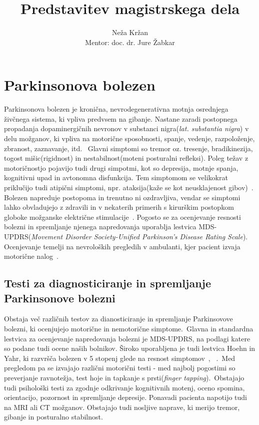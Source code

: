 \documentclass[a4paper,12pt]{article}
\title{Predstavitev magistrskega dela}
\author{Neža Kržan \\
Mentor: doc. dr. Jure Žabkar}
\begin{document}
\maketitle

\section{Parkinsonova bolezen}

Parkinsonova bolezen je kronična, nevrodegenerativna motnja osrednjega živčnega sistema, ki vpliva 
predvsem na gibanje. Nastane zaradi postopnega propadanja dopaminergičnih nevronov v substanci 
nigra(\textit{lat. substantia nigra}) v delu možganov, ki vpliva na motorične sposobnosti, spanje, vedenje, 
razpoloženje, zbranost, zaznavanje, itd. \
Glavni simptomi so tremor oz. tresenje, bradikinezija, togost mišic(rigidnost) in nestabilnost(moteni posturalni refleksi). 
Poleg težav z motoričnostjo pojavijo tudi drugi simpotmi, kot so depresija, 
motnje spanja, kognitivni upad in avtonomna disfunkcija. Tem simptomom se velikokrat priklučijo tudi 
atipični simptomi, npr. ataksija(kaže se kot neusklajenost gibov)~\cite{NINDS}. \\

Bolezen napreduje postopoma in trenutno ni ozdravljiva, vendar se simptomi lahko obvladujejo z zdravili 
in v nekaterih primerih s kirurškim postopkom globoke možganske električne stimulacije~\cite{Sveinbjornsdottir}. 
Pogosto se za ocenjevanje resnosti bolezni in spremljanje njenega napredovanja uporablja lestvica 
MDS-UPDRS(\textit{Movement Disorder Society-Unified Parkinson's Disease Rating Scale}). Ocenjevanje temelji na 
nevroloških pregledih v ambulanti, kjer pacient izvaja motorične nalog~\cite{Goetz}. \\

\subsection{Testi za diagnosticiranje in spremljanje Parkinsonove bolezni}

Obstaja več različnih testov za dianosticiranje in spremljanje Parkinsovove bolezni, ki ocenjujejo 
motorične in nemotorične simptome.\
Glavna in standardna lestvica za ocenjevanje napredovanja bolezni je MDS-UPDRS, na podlagi katere so 
podane tudi ocene naših bolnikov. Široko uporabljena je tudi lestvica Hoehn in Yahr, ki razvršča 
bolezen v 5 stopenj glede na resnost simptomov~\cite{Bhidayasiri}, ~\cite{wiki}.\
Med pregledom pa se izvajajo različni motorični testi - med najbolj pogostimi so preverjanje ravnotežja, 
test hoje in tapkanje s prsti(\textit{finger tapping}).\
Obstajajo tudi psihološki testi za zgodnje odkrivanje kognitivnih motenj, oceno spomina, orientacijo, 
pozornost in spremljanje depresije. Ponavadi pacienta napotijo tudi na MRI ali CT možganov. Obstajajo 
tudi nosljive naprave, ki merijo tremor, gibanje in posturalno stabilnost.
\end{document}
